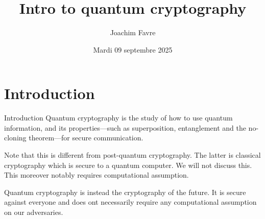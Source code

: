 \documentclass[a4paper]{article}
\title{Intro to quantum cryptography}
\author{Joachim Favre}
\date{Mardi 09 septembre 2025}
\begin{document}
\maketitle


\section{Introduction}

\begin{parag}{Introduction}
    Quantum cryptography is the study of how to use quantum information, and its properties---such as superposition, entanglement and the no-cloning theorem---for secure communication.

    Note that this is different from post-quantum cryptography. The latter is classical cryptography which is secure to a quantum computer. We will not discuss this. This moreover notably requires computational assumption.

    Quantum cryptography is instead the cryptography of the future. It is secure against everyone and does ont necessarily require any computational assumption on our adversaries.
\end{parag}
\end{document}
